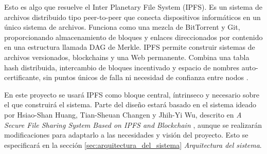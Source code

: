 Esto es algo que resuelve el Inter Planetary File System (IPFS). Es un sistema de archivos distribuido tipo peer-to-peer que conecta dispositivos informáticos en un único sistema de archivos. Funciona como una mezcla de BitTorrent y Git, proporcionando almacenamiento de bloques y enlaces direccionados por contenido en una estructura llamada DAG de Merkle. IPFS permite construir sistemas de archivos versionados, blockchains y una Web permanente. Combina una tabla hash distribuida, intercambio de bloques incentivado y espacio de nombres auto-certificante, sin puntos únicos de falla ni necesidad de confianza entre nodos \cite{benetIPFSContentAddressed2014}.

En este proyecto se usará IPFS como bloque central, íntrinseco y necesario sobre el que construirá el sistema. Parte del diseño estará basado
en el sistema ideado por Hsiao-Shan Huang, Tian-Sheuan Changen y Jhih-Yi Wu, descrito en \textit{A Secure File Sharing System Based on IPFS and Blockchain} \cite{huangSecureFileSharing2020}, aunque se realizarán modificaciones para adaptarlo a las necesidades y visión del proyecto. Esto se especificará en la sección \ref{sec:arquitectura_del_sistema} \textit{Arquitectura del sistema}.

